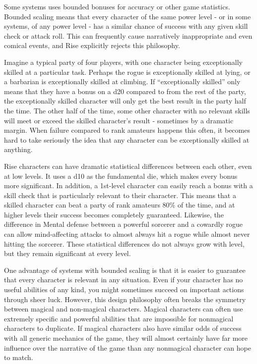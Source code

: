     Some systems uses bounded bonuses for accuracy or other game statistics.
    Bounded scaling means that every character of the same power level - or in some systems, of any power level - has a similar chance of success with any given skill check or attack roll.
    This can frequently cause narratively inappropriate and even comical events, and Rise explicitly rejects this philosophy.

    Imagine a typical party of four players, with one character being exceptionally skilled at a particular task.
    Perhaps the rogue is exceptionally skilled at lying, or a barbarian is exceptionally skilled at climbing.
    If ``exceptionally skilled'' only means that they have a  bonus on a d20 compared to  from the rest of the party, the exceptionally skilled character will only get the best result in the party half the time.
    The other half of the time, some other character with no relevant skills will meet or exceed the skilled character's result - sometimes by a dramatic margin.
    When failure compared to rank amateurs happens this often, it becomes hard to take seriously the idea that any character can be exceptionally skilled at anything.

    Rise characters can have dramatic statistical differences between each other, even at low levels.
    It uses a d10 as the fundamental die, which makes every bonus more significant.
    In addition, a 1st-level character can easily reach a  bonus with a skill check that is particularly relevant to their character.
    This means that a skilled character can beat a party of rank amateurs 80\% of the time, and at higher levels their success becomes completely guaranteed.
    Likewise, the difference in Mental defense between a powerful sorcerer and a cowardly rogue can allow mind-affecting attacks to almost always hit a rogue while almost never hitting the sorcerer.
    These statistical differences do not always grow with level, but they remain significant at every level.

    One advantage of systems with bounded scaling is that it is easier to guarantee that every character is relevant in any situation.
    Even if your character has no useful abilities of any kind, you might sometimes succeed on important actions through sheer luck.
    However, this design philosophy often breaks the symmetry between magical and non-magical characters.
    Magical characters can often use extremely specific and powerful abilities that are impossible for nonmagical characters to duplicate.
    If magical characters also have similar odds of success with all generic mechanics of the game, they will almost certainly have far more influence over the narrative of the game than any nonmagical character can hope to match.

